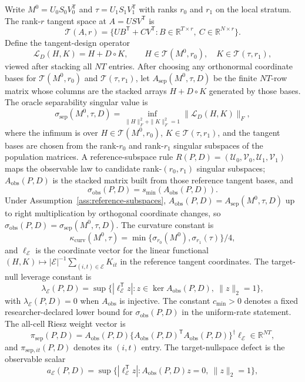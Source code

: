 \documentclass[11pt]{article}
\newcommand{\transpose}{\mathsf{T}}
\newcommand{\R}{\mathbb{R}}
\theoremstyle{definition}
\theoremstyle{plain}
\theoremstyle{remark}
\begin{document}
Write \(M^0=U_0S_0V_0^\transpose\) and \(\tau=U_1S_1V_1^\transpose\) with ranks \(r_0\) and \(r_1\) on the local stratum.  The rank-\(r\) tangent space at \(A=USV^\transpose\) is
\[
\mathcal T(A,r)=\{UB^\transpose+CV^\transpose:B\in\R^{T\times r},\ C\in\R^{N\times r}\}.
\]
Define the tangent-design operator
\[
\mathcal L_D(H,K)=H+D\circ K,\qquad H\in\mathcal T(M^0,r_0),\quad K\in\mathcal T(\tau,r_1),
\]
viewed after stacking all \(NT\) entries.  After choosing any orthonormal coordinate bases for \(\mathcal T(M^0,r_0)\) and \(\mathcal T(\tau,r_1)\), let \(A_{\mathrm{sep}}(M^0,\tau,D)\) be the finite \(NT\)-row matrix whose columns are the stacked arrays \(H+D\circ K\) generated by those bases.  The oracle separability singular value is
\[
\sigma_{\mathrm{sep}}(M^0,\tau,D)=
\inf_{\|H\|_F^2+\|K\|_F^2=1}
\|\mathcal L_D(H,K)\|_F,
\]
where the infimum is over \(H\in\mathcal T(M^0,r_0)\), \(K\in\mathcal T(\tau,r_1)\), and the tangent bases are chosen from the rank-\(r_0\) and rank-\(r_1\) singular subspaces of the population matrices.  A reference-subspace rule \(R(P,D)=(\mathcal U_0,\mathcal V_0,\mathcal U_1,\mathcal V_1)\) maps the observable law to candidate rank-\((r_0,r_1)\) singular subspaces; \(A_{\mathrm{obs}}(P,D)\) is the stacked matrix built from those reference tangent bases, and
\[
\sigma_{\mathrm{obs}}(P,D)=s_{\min}(A_{\mathrm{obs}}(P,D)).
\]
Under Assumption~\ref{ass:reference-subspaces}, \(A_{\mathrm{obs}}(P,D)=A_{\mathrm{sep}}(M^0,\tau,D)\) up to right multiplication by orthogonal coordinate changes, so \(\sigma_{\mathrm{obs}}(P,D)=\sigma_{\mathrm{sep}}(M^0,\tau,D)\).  The curvature constant is
\[
\kappa_{\mathrm{curv}}(M^0,\tau)=\min\{\sigma_{r_0}(M^0),\sigma_{r_1}(\tau)\}/4,
\]
and \(\ell_{\mathcal E}\) is the coordinate vector for the linear functional \((H,K)\mapsto |\mathcal E|^{-1}\sum_{(i,t)\in\mathcal E}K_{it}\) in the reference tangent coordinates.  The target-null leverage constant is
\[
\lambda_{\mathcal E}(P,D)=
\sup\{|\ell_{\mathcal E}^{\transpose}z|:
z\in\ker A_{\mathrm{obs}}(P,D),\ \|z\|_2=1\},
\]
with \(\lambda_{\mathcal E}(P,D)=0\) when \(A_{\mathrm{obs}}\) is injective.
The constant \(c_{\min}>0\) denotes a fixed researcher-declared lower bound for \(\sigma_{\mathrm{obs}}(P,D)\) in the uniform-rate statement.  The all-cell Riesz weight vector is
\[
\pi_{\mathrm{sep}}(P,D)=A_{\mathrm{obs}}(P,D)\{A_{\mathrm{obs}}(P,D)^\transpose A_{\mathrm{obs}}(P,D)\}^{\dagger}\ell_{\mathcal E}\in\R^{NT},
\]
and \(\pi_{\mathrm{sep},it}(P,D)\) denotes its \((i,t)\) entry.
The target-nullspace defect is the observable scalar
\[
a_{\mathcal E}(P,D)=
\sup\{|\ell_{\mathcal E}^{\transpose}z|: A_{\mathrm{obs}}(P,D)z=0,\ \|z\|_2=1\},
\]
\end{document}
